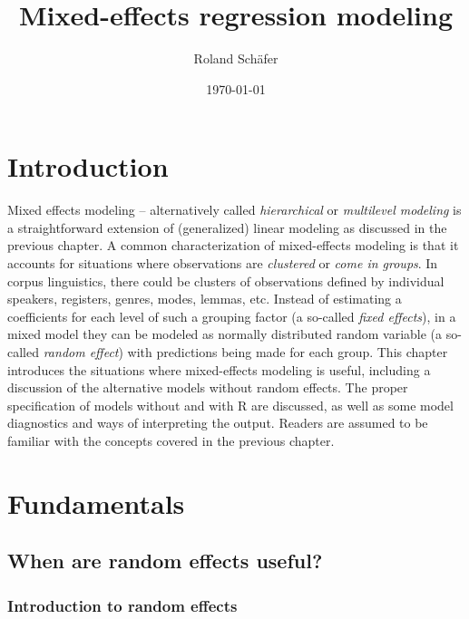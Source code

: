 \documentclass[a4paper,12pt]{article}
\title{Mixed-effects regression modeling}
\author{Roland Schäfer}
\affil{Freie Universität Berlin}
\date{\today}
\begin{document}
       

\maketitle

\section{Introduction}
\label{sec:introduction}

Mixed effects modeling -- alternatively called \textit{hierarchical} or \textit{multilevel modeling} is a straightforward extension of (generalized) linear modeling as discussed in the previous chapter.
A common characterization of mixed-effects modeling is that it accounts for situations where observations are \textit{clustered} or \textit{come in groups}.
In corpus linguistics, there could be clusters of observations defined by individual speakers, registers, genres, modes, lemmas, etc.
Instead of estimating a coefficients for each level of such a grouping factor (a so-called \textit{fixed effects}), in a mixed model they can be modeled as normally distributed random variable (a so-called \textit{random effect}) with predictions being made for each group.
This chapter introduces the situations where mixed-effects modeling is useful, including a discussion of the alternative models without random effects.
The proper specification of models without and with R are discussed, as well as some model diagnostics and ways of interpreting the output.
Readers are assumed to be familiar with the concepts covered in the previous chapter.

\section{Fundamentals}
\label{sec:fundamentals}

\subsection{When are random effects useful?}
\label{sec:whenrandomeffectsareuseful}

\subsubsection{Introduction to random effects}
\label{sec:introductiontorandomeffects}
\end{document}
